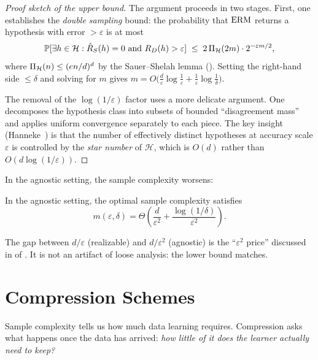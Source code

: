 \begin{proof}[Proof sketch of the upper bound]
The argument proceeds in two stages.  First, one establishes the \emph{double
sampling} bound: the probability that $\mathrm{ERM}$ returns a hypothesis with error
$> \varepsilon$ is at most
\[
  \mathbb{P}[\exists h \in \mathcal{H} : \hat{R}_S(h) = 0 \text{ and }
    R_D(h) > \varepsilon]
  \;\leq\; 2\,\Pi_\mathcal{H}(2m) \cdot 2^{-\varepsilon m / 2},
\]
where $\Pi_\mathcal{H}(n) \leq (en/d)^d$ by the Sauer--Shelah lemma
().  Setting the right-hand side $\leq \delta$ and
solving for $m$ gives $m = O\!\bigl(\frac{d}{\varepsilon}
\log\frac{1}{\varepsilon} + \frac{1}{\varepsilon}\log\frac{1}{\delta}\bigr)$.

The removal of the $\log(1/\varepsilon)$ factor uses a more delicate argument.
One decomposes the hypothesis class into subsets of bounded ``disagreement mass''
and applies uniform convergence separately to each piece.  The key insight
(Hanneke~\cite{Hanneke2016}) is that the number of effectively distinct
hypotheses at accuracy scale $\varepsilon$ is controlled by the \emph{star
number} of $\mathcal{H}$, which is $O(d)$ rather than $O(d \log(1/\varepsilon))$.
\end{proof}

In the agnostic setting, the sample complexity worsens:

\begin{thm}
\label{thm:sample-agnostic}
In the agnostic setting, the optimal sample complexity satisfies
\[
  m(\varepsilon, \delta) = \Theta\!\left(\frac{d}{\varepsilon^2}
    + \frac{\log(1/\delta)}{\varepsilon^2}\right).
\]
\end{thm}

The gap between $d/\varepsilon$ (realizable) and $d/\varepsilon^2$ (agnostic)
is the ``$\varepsilon^2$ price'' discussed in  of
.  It is not an artifact of loose analysis: the lower bound
matches.



\section{Compression Schemes}
\label{sec:compression}

Sample complexity tells us how much data learning requires.  Compression asks
what happens once the data has arrived: \emph{how little of it does the learner
actually need to keep?}

